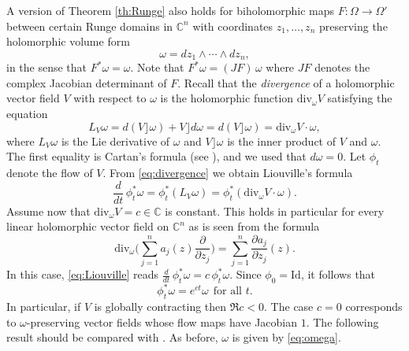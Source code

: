 \documentclass[12pt]{amsart}
\theoremstyle{definition}
\numberwithin{equation}{section}
\numberwithin{figure}{section}
\newcommand\C{\mathbb{C}}
\newcommand\di{\partial}
\renewcommand\div{\mathrm{div}}
\newcommand\Id{\mathrm{Id}}
\numberwithin{equation}{section}
\begin{document}
%
%
A version of Theorem \ref{th:Runge} also holds for biholomorphic
maps $F:\Omega\to\Omega'$ between certain Runge domains 
in $\C^n$ with coordinates $z_1,\ldots,z_n$ %
preserving the holomorphic volume form
%
\begin{equation}\label{eq:omega}
	\omega=d z_1\wedge \cdots\wedge d z_n,
\end{equation} 
%
in the sense that $F^*\omega=\omega$. 
Note that $F^*\omega = (JF)\, \omega$
where $JF$ denotes the complex Jacobian determinant of $F$.
Recall that the {\em divergence} of a holomorphic vector field         			
$V$ with respect to $\omega$ is the holomorphic function 
$\div_\omega V$ satisfying the equation
%
\begin{equation}\label{eq:divergence}
    L_V \omega= d (V\rfloor \omega) + V\rfloor d\omega
    = d (V\rfloor \omega) = \div_\omega V\cdotp \omega,
\end{equation}
%
where $L_V \omega$ is the Lie derivative of $\omega$
and $V\rfloor \omega$ is the inner product of $V$ and
$\omega$. The first equality is Cartan's formula
(see \cite[Theorem 6.4.8]{AbrahamMarsdenRatiu1988}), 
and we used that $d\omega=0$.
Let $\phi_t$ denote the flow of $V$. 
From \eqref{eq:divergence} we obtain Liouville's formula 
%
\begin{equation}\label{eq:Liouville}
    \frac{d}{dt}\, \phi_t^*\omega = \phi_t^* (L_V \omega) 
     =  \phi_t^* (\div_\omega V \cdotp \omega).
\end{equation}
%
Assume now that $\div_\omega V=c\in \C$ is constant. 
This holds in particular for every linear holomorphic vector field on $\C^n$ 
as is seen from the formula
\begin{equation}\label{eq:explicit}
    \div_\omega \biggl( \sum_{j=1}^n a_j(z) \frac{\di}{\di z_j}\biggr) 
    = \sum_{j=1}^n  \frac{\di a_j}{\di z_j}(z).
\end{equation}
In this case, \eqref{eq:Liouville} reads 
$\frac{d}{dt}\, \phi_t^*\omega=c \, \phi_t^*\omega$. Since 
$\phi_0=\Id$, it follows that 
\begin{equation}\label{eq:ec}
	\phi_t^*\omega=e^{ct} \omega\ \ \text{for all $t$}.
\end{equation}
In particular, if $V$ is globally contracting then $\Re c<0$. 
The case $c=0$ corresponds to $\omega$-preserving
vector fields whose flow maps have Jacobian $1$. 
The following result should be compared  
with \cite[V5, Theorem 1.10 (i)]{ChatterjeeGorai2025X}.
As before, $\omega$ is given by \eqref{eq:omega}.
\end{document}

